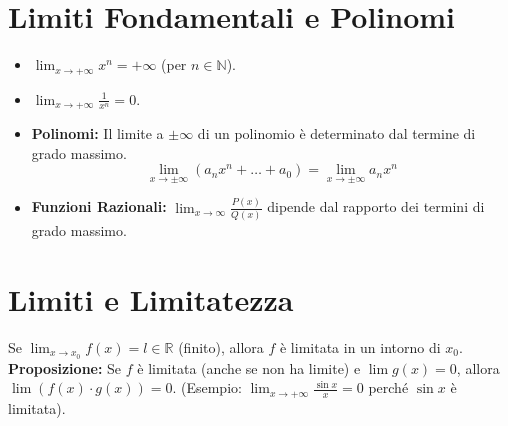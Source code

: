 \documentclass{article}
\begin{document}
\section*{Limiti Fondamentali e Polinomi}
\begin{itemize}
    \item $\lim_{x \to +\infty} x^n = +\infty$ (per $n \in \mathbb{N}$).
    \item $\lim_{x \to +\infty} \frac{1}{x^n} = 0$.
    \item \textbf{Polinomi:} Il limite a $\pm \infty$ di un polinomio è determinato dal termine di grado massimo.
    $$ \lim_{x \to \pm \infty} (a_n x^n + \dots + a_0) = \lim_{x \to \pm \infty} a_n x^n $$
    \item \textbf{Funzioni Razionali:} $\lim_{x \to \infty} \frac{P(x)}{Q(x)}$ dipende dal rapporto dei termini di grado massimo.
\end{itemize}

\section*{Limiti e Limitatezza}
Se $\lim_{x \to x_0} f(x) = l \in \mathbb{R}$ (finito), allora $f$ è limitata in un intorno di $x_0$.
\textbf{Proposizione:}
Se $f$ è limitata (anche se non ha limite) e $\lim g(x) = 0$, allora $\lim (f(x) \cdot g(x)) = 0$.
(Esempio: $\lim_{x \to +\infty} \frac{\sin x}{x} = 0$ perché $\sin x$ è limitata).
\end{document}
